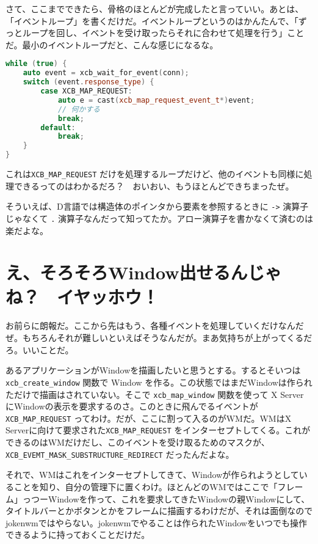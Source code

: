 \documentclass[12pt,a4paper]{jsarticle}
\begin{document}
さて、ここまでできたら、骨格のほとんどが完成したと言っていい。あとは、「イベントループ」を書くだけだ。イベントループというのはかんたんで、「ずっとループを回し、イベントを受け取ったらそれに合わせて処理を行う」ことだ。最小のイベントループだと、こんな感じになるな。

\begin{lstlisting}[language=C++]
while (true) {
	auto event = xcb_wait_for_event(conn);
	switch (event.response_type) {
		case XCB_MAP_REQUEST:
			auto e = cast(xcb_map_request_event_t*)event;
			// 何かする
			break;
		default:
			break;
	}
}
\end{lstlisting}

これは\lstinline{XCB_MAP_REQUEST} だけを処理するループだけど、他のイベントも同様に処理できるってのはわかるだろ？　おいおい、もうほとんどできちまったぜ。

そういえば、D言語では構造体のポインタから要素を参照するときに \lstinline{->} 演算子じゃなくて \lstinline{.} 演算子なんだって知ってたか。アロー演算子を書かなくて済むのは楽だよな。

\section{え、そろそろWindow出せるんじゃね？　イヤッホウ！}

お前らに朗報だ。ここから先はもう、各種イベントを処理していくだけなんだぜ。もちろんそれが難しいといえばそうなんだが。まあ気持ちが上がってくるだろ。いいことだ。

あるアプリケーションがWindowを描画したいと思うとする。するとそいつは \lstinline{xcb_create_window} 関数で Window を作る。この状態ではまだWindowは作られただけで描画はされていない。そこで \lstinline{xcb_map_window} 関数を使って X Server にWindowの表示を要求するのさ。このときに飛んでるイベントが \lstinline{XCB_MAP_REQUEST} ってわけ。だが、ここに割って入るのがWMだ。WMはX Serverに向けて要求された\lstinline{XCB_MAP_REQUEST} をインターセプトしてくる。これができるのはWMだけだし、このイベントを受け取るためのマスクが、 \lstinline{XCB_EVEMT_MASK_SUBSTRUCTURE_REDIRECT} だったんだよな。

それで、WMはこれをインターセプトしてきて、Windowが作られようとしていることを知り、自分の管理下に置くわけ。ほとんどのWMではここで「フレーム」っつーWindowを作って、これを要求してきたWindowの親Windowにして、タイトルバーとかボタンとかをフレームに描画するわけだが、それは面倒なのでjokenwmではやらない。jokenwmでやることは作られたWindowをいつでも操作できるように持っておくことだけだ。
\end{document}
